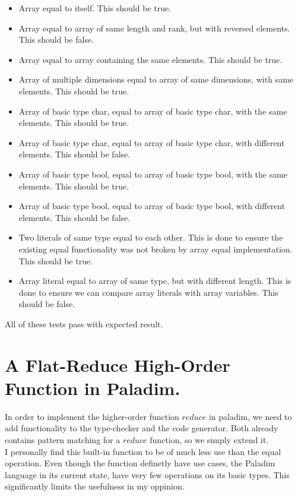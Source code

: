 \documentclass[12pt]{article}
\begin{document}
\begin{itemize}
    \item Array equal to itself. This should be true.
    \item Array equal to array of same length and rank, but with reversed elements. This should be false.
    \item Array equal to array containing the same elements. This should be true.
    \item Array of multiple dimensions equal to array of same dimensions, with same elements. This should be true.
    \item Array of basic type char, equal to array of basic type char, with the same elements. This should be true.
    \item Array of basic type char, equal to array of basic type char, with different elements. This should be false.
    \item Array of basic type bool, equal to array of basic type bool, with the same elements. This should be true.
    \item Array of basic type bool, equal to array of basic type bool, with different elements. This should be false.
    \item Two literals of same type equal to each other. This is done to ensure the existing equal functionality was not broken by array equal implementation. This should be true.
    \item Array literal equal to array of same type, but with different length. This is done to ensure we can compare array literals with array variables. This should be false.
\end{itemize}

\noindent All of these tests pass with expected result.

\pagebreak

\section{A Flat-Reduce High-Order Function in Paladim.}

In order to implement the higher-order function $reduce$ in paladim, we need to add functionality to the type-checker and the code generator. Both already contains pattern matching for a $reduce$ function, so we simply extend it.\\

I personally find this built-in function to be of much less use than the equal operation. Even though the function definetly have use cases, the Paladim language in its current state, have very few operations on its basic types. This significantly limits the usefulness in my oppinion.
\end{document}
